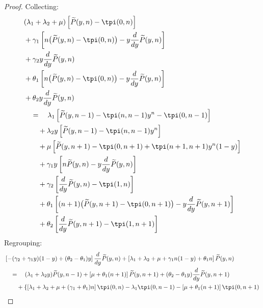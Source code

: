\begin{proof}
    Collecting:
    \begin{align*}
        \begin{split}
            & (\lambda_1 + \lambda_2 + \mu) \left[ \widetilde{P}(y,n) - \tpi(0,n) \right] \\
            & + \gamma_1 \left[ n \big( \widetilde{P}(y,n) - \tpi(0,n) \big) - y \frac{d}{dy} \widetilde{P}(y,n) \right] \\
            & + \gamma_2 y \frac{d}{dy} \widetilde{P}(y,n) \\
            & + \theta_1 \left[ n \big( \widetilde{P}(y,n) - \tpi(0,n) \big) - y \frac{d}{dy} \widetilde{P}(y,n) \right] \\
            & + \theta_2 y \frac{d}{dy} \widetilde{P}(y,n) \\
            & \quad = \quad \lambda_1 \left[ \widetilde{P}(y,n-1) - \tpi(n,n-1) y^n - \tpi(0,n-1) \right] \\
            & \quad \quad + \lambda_2 y \left[ \widetilde{P}(y,n-1) - \tpi(n,n-1) y^n \right] \\
            & \quad \quad + \mu \left[ \widetilde{P}(y,n+1) - \tpi(0,n+1) + \tpi(n+1,n+1) y^n (1-y) \right] \\
            & \quad \quad + \gamma_1 y \left[ n \widetilde{P}(y,n) - y \frac{d}{dy} \widetilde{P}(y,n) \right] \\
            & \quad \quad + \gamma_2 \left[ \frac{d}{dy} \widetilde{P}(y,n) - \tpi(1,n) \right] \\
            & \quad \quad + \theta_1 \left[ (n+1) \big( \widetilde{P}(y,n+1) - \tpi(0,n+1) \big) - y \frac{d}{dy} \widetilde{P}(y,n+1) \right] \\
            & \quad \quad + \theta_2 \left[ \frac{d}{dy} \widetilde{P}(y,n+1) - \tpi(1,n+1) \right]
        \end{split}
    \end{align*}
    Regrouping:
    \begin{align*}
        \begin{split}
            & \left[ -(\gamma_2 + \gamma_1 y)(1-y) + (\theta_2 - \theta_1) y \right] \frac{d}{dy} \widetilde{P}(y,n) + \left[ \lambda_1 + \lambda_2 + \mu + \gamma_1 n(1-y) + \theta_1 n \right] \widetilde{P}(y,n) \\
            & \quad = \quad (\lambda_1 + \lambda_2 y) \widetilde{P}(y,n-1) + \left[ \mu + \theta_1 (n+1) \right] \widetilde{P}(y,n+1) + (\theta_2 - \theta_1 y) \frac{d}{dy} \widetilde{P}(y,n+1) \\
            & \quad \quad + \left\{ \left[ \lambda_1 + \lambda_2 + \mu + (\gamma_1 + \theta_1) n \right] \tpi(0,n) - \lambda_1 \tpi(0,n-1) - \left[ \mu + \theta_1 (n+1) \right] \tpi(0,n+1) \right. \\

\end{split}
\end{align*}
\end{proof}
